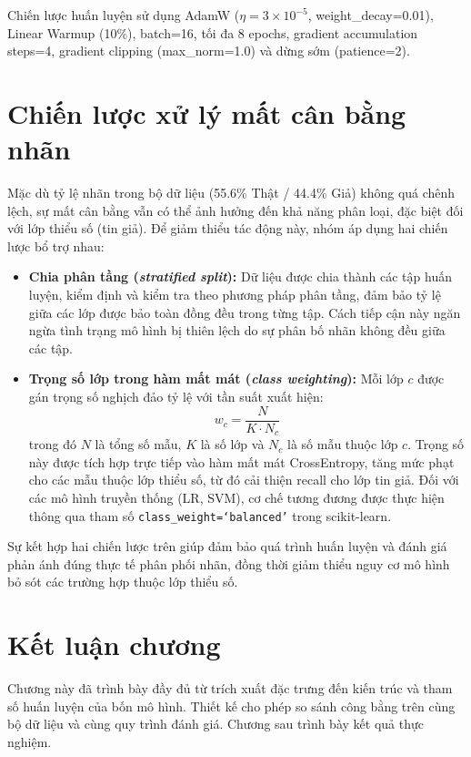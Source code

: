 \documentclass[12pt, a4paper]{report}
\newcommand{\pctReal}{55.6}              %
\newcommand{\pctFake}{44.4}              %
\begin{document}
Chiến lược huấn luyện sử dụng AdamW
($\eta = 3 \times 10^{-5}$, weight\_decay=0.01), Linear Warmup (10\%),
batch=16, tối đa 8 epochs, gradient accumulation steps=4, gradient
clipping (max\_norm=1.0) và dừng sớm (patience=2).

\section{Chiến lược xử lý mất cân bằng nhãn}

Mặc dù tỷ lệ nhãn trong bộ dữ liệu (\pctReal\% Thật / \pctFake\% Giả) không quá chênh lệch, sự mất cân bằng vẫn có thể ảnh hưởng đến khả năng phân loại, đặc biệt đối với lớp thiểu số (tin giả). Để giảm thiểu tác động này, nhóm áp dụng hai chiến lược bổ trợ nhau:

\begin{itemize}[leftmargin=2em]
  \item \textbf{Chia phân tầng (\textit{stratified split}):} Dữ liệu được chia thành các tập huấn luyện, kiểm định và kiểm tra theo phương pháp phân tầng, đảm bảo tỷ lệ giữa các lớp được bảo toàn đồng đều trong từng tập. Cách tiếp cận này ngăn ngừa tình trạng mô hình bị thiên lệch do sự phân bố nhãn không đều giữa các tập.
  
  \item \textbf{Trọng số lớp trong hàm mất mát (\textit{class weighting}):} Mỗi lớp $c$ được gán trọng số nghịch đảo tỷ lệ với tần suất xuất hiện:
  \[
    w_c = \frac{N}{K \cdot N_c}
  \]
  trong đó $N$ là tổng số mẫu, $K$ là số lớp và $N_c$ là số mẫu thuộc lớp $c$. Trọng số này được tích hợp trực tiếp vào hàm mất mát CrossEntropy, tăng mức phạt cho các mẫu thuộc lớp thiểu số, từ đó cải thiện recall cho lớp tin giả. Đối với các mô hình truyền thống (LR, SVM), cơ chế tương đương được thực hiện thông qua tham số \texttt{class\_weight=`balanced'} trong scikit-learn.
\end{itemize}

Sự kết hợp hai chiến lược trên giúp đảm bảo quá trình huấn luyện và đánh giá phản ánh đúng thực tế phân phối nhãn, đồng thời giảm thiểu nguy cơ mô hình bỏ sót các trường hợp thuộc lớp thiểu số.

\section{Kết luận chương}

Chương này đã trình bày đầy đủ từ trích xuất đặc trưng đến kiến trúc và tham số huấn luyện của bốn mô hình. Thiết kế cho phép so sánh công bằng trên cùng bộ dữ liệu và cùng quy trình đánh giá. Chương sau trình bày kết quả thực nghiệm.
\end{document}

